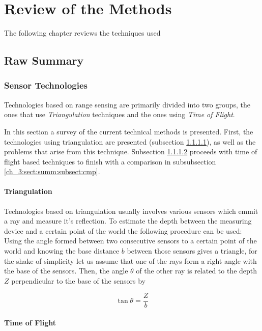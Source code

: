 \chapter{Review of the Methods}

  The following chapter reviews the techniques used 

  \section{Raw Summary}
    \subsection{Sensor Technologies}

    Technologies based on range sensing are primarily divided into two groups, the ones that use \textit{Triangulation} techniques and the ones using \textit{Time of Flight}.

    In this section a survey of the current technical methods is presented. First, the technologies using triangulation are presented (subsection \ref{ch_3:sect:summ:subsect:triang}), as well as the problems that arise from this technique. Subsection \ref{ch_3:sect:summ:subsect:tof} proceeds with time of flight based techniques to finish with a comparison in subsubsection \ref{ch_3:sect:summ:subsect:cmp}.

    \subsubsection{Triangulation} \label{ch_3:sect:summ:subsect:triang}

     Technologies based on triangulation usually involves various sensors which emmit a ray and measure it's reflection. To estimate the depth between the measuring device and a certain point of the world the following procedure can be used: Using the angle formed between two consecutive sensors to a certain point of the world and knowing the base distance $b$ between those sensors gives a triangle, for the shake of simplicity let us assume that one of the rays form a right angle with the base of the sensors. Then, the angle $\theta$ of the other ray is related to the depth $Z$ perpendicular to the base of the sensors by

    \begin{equation}
      \tan \theta = \frac{Z}{b}
    \end{equation}

    \subsubsection{Time of Flight} \label{ch_3:sect:summ:subsect:tof}

